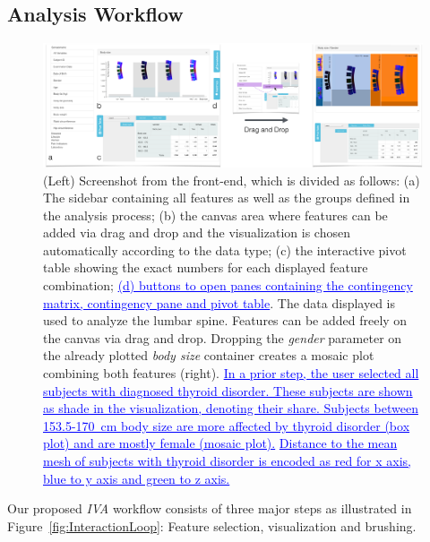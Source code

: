 \documentclass[journal]{style/vgtc} 			          %
\newcommand{\add}[1]{\textcolor{blue}{\uline{#1}}}
\begin{document}
\subsection{Analysis Workflow}
\begin{figure}[htb]
 \centering
 \includegraphics[width=1\textwidth, resolution=300]{figures/visualization}
 \caption{
 (Left) Screenshot from the front-end, which is divided as follows: (a) The sidebar containing all features as well as the groups defined in the analysis process; (b) the canvas area where features can be added via drag and drop and the visualization is chosen automatically according to the data type; (c) the interactive pivot table showing the exact numbers for each displayed feature combination; \add{(d) buttons to open panes containing the contingency matrix, contingency pane and pivot table}.
 The data displayed is used to analyze the lumbar spine. Features can be added freely on the canvas via drag and drop.
 Dropping the \emph{gender} parameter on the already plotted \emph{body size} container creates a mosaic plot combining both features (right).
 \add{In a prior step, the user selected all subjects with diagnosed thyroid disorder.
 These subjects are shown as shade in the visualization, denoting their share.
 Subjects between 153.5-170~cm body size are more affected by thyroid disorder (box plot) and are mostly female (mosaic plot).}
 \add{Distance to the mean mesh of subjects with thyroid disorder is encoded as red for x axis, blue to y axis and green to z axis.}
 }
 \label{fig:visualization}
\end{figure}
Our proposed \emph{IVA} workflow consists of three major steps as illustrated in Figure~\ref{fig:InteractionLoop}: Feature selection, visualization and brushing.
\end{document}
